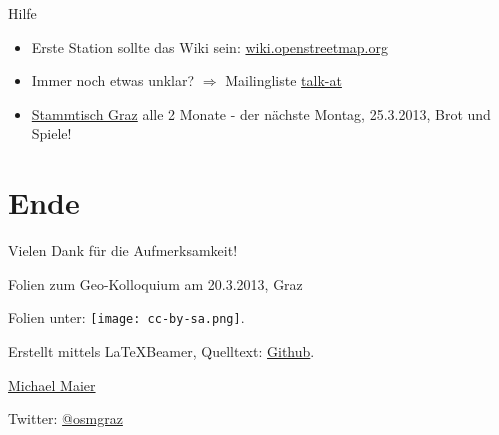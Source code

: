 \documentclass{beamer}
\begin{document}
% 
% 
% 
\begin{frame}{Hilfe}

\begin{itemize}
  \item Erste Station sollte das Wiki sein: \href{http://wiki.openstreetmap.org}{wiki.openstreetmap.org}
  \item Immer noch etwas unklar? $\Rightarrow$ Mailingliste \href{http://lists.openstreetmap.org/listinfo/talk-at}{talk-at}
  \pause
  \item \href{http://wiki.openstreetmap.org/wiki/Graz/Stammtisch}{Stammtisch Graz} alle 2 Monate - der nächste Montag, 25.3.2013, Brot und Spiele!
\end{itemize}

\end{frame}

\section{Ende}

\begin{frame}{Vielen Dank für die Aufmerksamkeit!}

  Folien zum Geo-Kolloquium am 20.3.2013, Graz
\vspace{1cm}

Folien unter: \texttt{[image: cc-by-sa.png]}.
\vspace{1cm}

Erstellt mittels \LaTeX Beamer, Quelltext: \href{https://github.com/species/vortrag-osm-geo-kolloquium}{Github}.
\vspace{1cm}

\href{mailto:michael.maier@student.tugraz.at}{Michael Maier}

Twitter: \href{https://twitter.com/osmgraz}{@osmgraz}
\end{frame}
\end{document}
